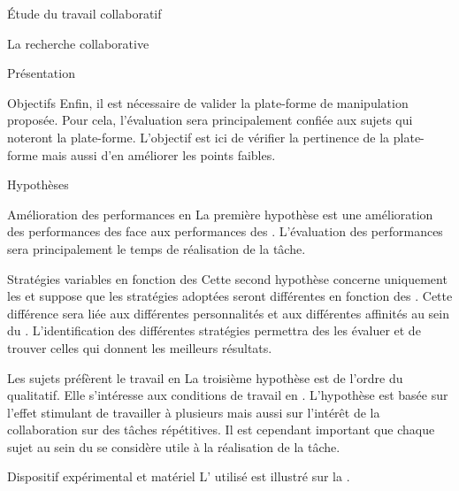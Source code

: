 \documentclass[myfrancais]{mythesis}
\begin{document}
\begin{mypart}{Étude du travail collaboratif}
\begin{mychapter}{La recherche collaborative}
\begin{mysection}{Présentation}
\begin{mysubsection}{Objectifs}
					Enfin, il est nécessaire de valider la plate-forme de manipulation proposée.
					Pour cela, l'évaluation sera principalement confiée aux sujets qui noteront la plate-forme.
					L'objectif est ici de vérifier la pertinence de la plate-forme mais aussi d'en améliorer les points faibles.
				\end{mysubsection}
				\begin{mysubsection}{Hypothèses}
					\begin{myparagraph}{ Amélioration des performances en }
						La première hypothèse est une amélioration des performances des  face aux performances des .
						L'évaluation des performances sera principalement le temps de réalisation de la tâche.
					\end{myparagraph}
					\begin{myparagraph}{ Stratégies variables en fonction des }
						Cette second hypothèse concerne uniquement les  et suppose que les stratégies adoptées seront différentes en fonction des .
						Cette différence sera liée aux différentes personnalités et aux différentes affinités au sein du .
						L'identification des différentes stratégies permettra des les évaluer et de trouver celles qui donnent les meilleurs résultats.
					\end{myparagraph}
					\begin{myparagraph}{ Les sujets préfèrent le travail en }
						La troisième hypothèse est de l'ordre du qualitatif.
						Elle s'intéresse aux conditions de travail en .
						L'hypothèse est basée sur l'effet stimulant de travailler à plusieurs mais aussi sur l'intérêt de la collaboration sur des tâches répétitives.
						Il est cependant important que chaque sujet au sein du  se considère utile à la réalisation de la tâche.
					\end{myparagraph}
				\end{mysubsection}
			\end{mysection}
			\begin{mysection}{Dispositif expérimental et matériel}
				L' utilisé est illustré sur la .

\end{mysection}
\end{mychapter}
\end{mypart}
\end{document}
